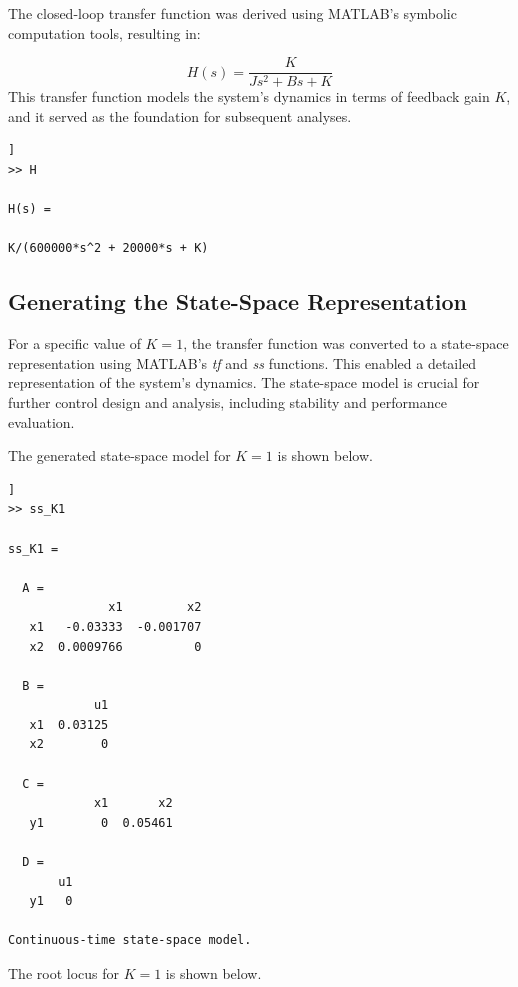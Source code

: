 \documentclass[a4paper, 12pt, english]{article}
\begin{document}
\noindent
The closed-loop transfer function was derived using MATLAB's symbolic computation tools, resulting in:

\[ H(s) = \frac{K}{J{s}^{2} + B{s} + K} \]
This transfer function models the system’s dynamics in terms of feedback gain $K$, and it served as the foundation for subsequent analyses.

\begin{lstlisting}[style=commandstyle,caption=Command line output]]
>> H
 
H(s) =
 
K/(600000*s^2 + 20000*s + K)
\end{lstlisting}

\subsection{Generating the State-Space Representation} \label{sec:generating the state-space representation}


For a specific value of $K = 1$, the transfer function was converted to a state-space representation using MATLAB’s \textit{tf} and \textit{ss} functions. This enabled a detailed representation of the system's dynamics. The state-space model is crucial for further control design and analysis, including stability and performance evaluation.

The generated state-space model for $K = 1$ is shown below.

\begin{lstlisting}[style=commandstyle,caption=Command line output]]
>> ss_K1

ss_K1 =
 
  A = 
              x1         x2
   x1   -0.03333  -0.001707
   x2  0.0009766          0
 
  B = 
            u1
   x1  0.03125
   x2        0
 
  C = 
            x1       x2
   y1        0  0.05461
 
  D = 
       u1
   y1   0
 
Continuous-time state-space model.
\end{lstlisting} 

The root locus for $K = 1$ is shown below.
\end{document}

